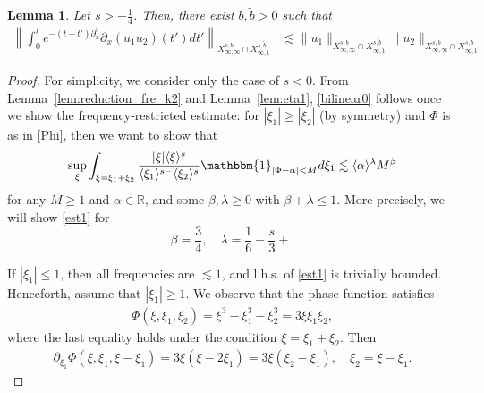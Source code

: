 \documentclass[%
11pt,  reqno]{amsart}
\newcommand{\fia}{\mathbbm{1}_{|\Phi-\alpha|<M}}
\newcommand{\jap}[1]{\langle #1 \rangle}
\newcommand{\5}{\textup{V}}
\newcommand{\les}{\lesssim}
\newcommand{\wt}{\widetilde}
\newtheorem{lemma}[theorem]{Lemma}
\theoremstyle{remark}
\newcommand{\R}{\mathbb{R}}
\newcommand{\al}{\alpha}
\newcommand{\be}{\beta}
\newcommand{\ld}{\lambda}
\numberwithin{equation}{section}
\numberwithin{theorem}{section}
\begin{document}
\begin{lemma}\label{LEM:bil0}
Let $s>-\frac14$. Then, there exist $b,\wt b >0 $ 
 such that 
\begin{align}
\label{bilinear0}
\left\|\int_0^te^{-(t-t')\partial_x^3}\partial_x(u_1u_2) (t')dt' \right\|_{X^{s,b}_{\infty, \infty}\cap X^{s,\tilde{b}}_{\infty, 1} } & \les 
\|u_1\|_{X^{s,b}_{\infty, \infty}\cap X^{s,\tilde{b}}_{\infty, 1} }
\|u_2\|_{X^{s,b}_{\infty, \infty}\cap X^{s,\tilde{b}}_{\infty, 1} }
\end{align}
\end{lemma}



\begin{proof}%


For simplicity, we consider only the case of $s<0$.
From Lemma~\ref{lem:reduction_fre_k2} and Lemma~\ref{lem:eta1}, \eqref{bilinear0} follows once we show the frequency-restricted estimate: for $|\xi_1| \ge |\xi_2|$ (by symmetry) and $\Phi$ is as in \eqref{Phi}, then we want to show that
\begin{equation}
\label{est1}
\sup_{\xi} \int_{\xi=\xi_1+\xi_2}
\frac{|\xi|\jap{\xi}^s}{\jap{\xi_1}^{s-}\jap{\xi_2}^s}
\fia d\xi_1
\lesssim 
\jap{\al}^{\ld } M^{\be} 
\end{equation}
for any $M\ge 1$ and $\al\in\R$, and some $\be,\ld \ge 0$ with $\be+\ld \le 1$. More precisely, we will show \eqref{est1} for
$$
\beta=\frac34,\quad \lambda=\frac{1}{6}-\frac s3+. 
$$


If $|\xi_1| \le 1$, then all frequencies are $\les1$, and l.h.s. of \eqref{est1} is trivially bounded. Henceforth, assume that $|\xi_1| \ge 1$. 
We observe that the phase function satisfies
\begin{align}
\label{phase2}
\Phi (\xi, \xi_1, \xi_2) = \xi^3 - \xi_1^3 - \xi_2^3 = 3 \xi \xi_1 \xi_2, 
\end{align}
where the last equality holds under the condition $\xi= \xi_1 + \xi_2$. Then
\begin{align}
\label{phase2a}
\partial_{\xi_1} \Phi(\xi, \xi_1,\xi-\xi_1) 
= 
3 \xi (\xi -2 \xi_1)
= 
3 \xi(\xi_2 - \xi_1)
, \quad \xi_2=\xi-\xi_1.
\end{align}


\end{proof}
\end{document}
